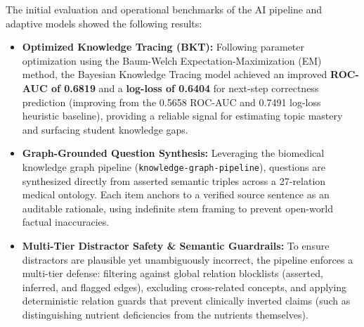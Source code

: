 The initial evaluation and operational benchmarks of the AI pipeline and adaptive models showed the following results:

\begin{itemize}
    \item \textbf{Optimized Knowledge Tracing (BKT):} Following parameter optimization using the Baum-Welch Expectation-Maximization (EM) method, the Bayesian Knowledge Tracing model achieved an improved \textbf{ROC-AUC of 0.6819} and a \textbf{log-loss of 0.6404} for next-step correctness prediction (improving from the 0.5658 ROC-AUC and 0.7491 log-loss heuristic baseline), providing a reliable signal for estimating topic mastery and surfacing student knowledge gaps.
    \item \textbf{Graph-Grounded Question Synthesis:} Leveraging the biomedical knowledge graph pipeline (\texttt{knowledge-graph-pipeline}), questions are synthesized directly from asserted semantic triples across a 27-relation medical ontology. Each item anchors to a verified source sentence as an auditable rationale, using indefinite stem framing to prevent open-world factual inaccuracies.
    \item \textbf{Multi-Tier Distractor Safety \& Semantic Guardrails:} To ensure distractors are plausible yet unambiguously incorrect, the pipeline enforces a multi-tier defense: filtering against global relation blocklists (asserted, inferred, and flagged edges), excluding cross-related concepts, and applying deterministic relation guards that prevent clinically inverted claims (such as distinguishing nutrient deficiencies from the nutrients themselves).
\end{itemize}